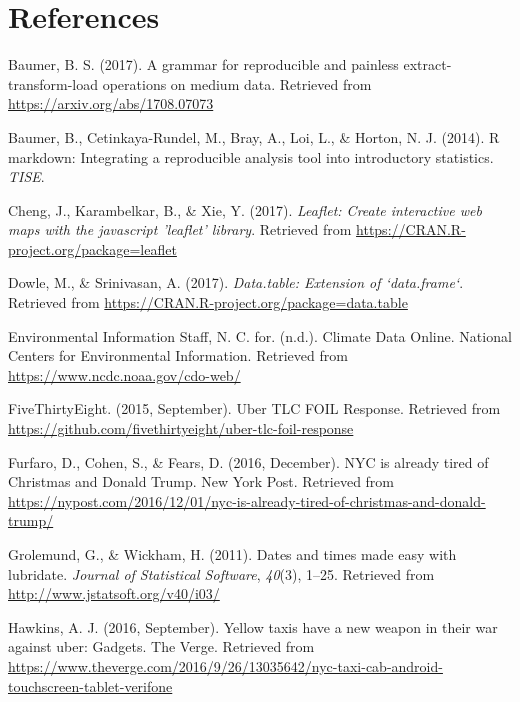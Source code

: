 \documentclass[12pt,twoside]{reedthesis}
\theoremstyle{definition}
\theoremstyle{definition}
\theoremstyle{definition}
\theoremstyle{remark}
\begin{document}
\chapter*{References}\label{references}


\noindent

\setlength{\parindent}{-0.20in} \setlength{\leftskip}{0.20in}
\setlength{\parskip}{8pt}

\hypertarget{refs}{}
\hypertarget{ref-pkgetl}{}
Baumer, B. S. (2017). A grammar for reproducible and painless
extract-transform-load operations on medium data. Retrieved from
\url{https://arxiv.org/abs/1708.07073}

\hypertarget{ref-baumer2014}{}
Baumer, B., Cetinkaya-Rundel, M., Bray, A., Loi, L., \& Horton, N. J.
(2014). R markdown: Integrating a reproducible analysis tool into
introductory statistics. \emph{TISE}.

\hypertarget{ref-pkgleaflet}{}
Cheng, J., Karambelkar, B., \& Xie, Y. (2017). \emph{Leaflet: Create
interactive web maps with the javascript 'leaflet' library}. Retrieved
from \url{https://CRAN.R-project.org/package=leaflet}

\hypertarget{ref-pkgdatatable}{}
Dowle, M., \& Srinivasan, A. (2017). \emph{Data.table: Extension of
`data.frame`}. Retrieved from
\url{https://CRAN.R-project.org/package=data.table}

\hypertarget{ref-noaa}{}
Environmental Information Staff, N. C. for. (n.d.). Climate Data Online.
National Centers for Environmental Information. Retrieved from
\url{https://www.ncdc.noaa.gov/cdo-web/}

\hypertarget{ref-uber538}{}
FiveThirtyEight. (2015, September). Uber TLC FOIL Response. Retrieved
from \url{https://github.com/fivethirtyeight/uber-tlc-foil-response}

\hypertarget{ref-furfaro2016}{}
Furfaro, D., Cohen, S., \& Fears, D. (2016, December). NYC is already
tired of Christmas and Donald Trump. New York Post. Retrieved from
\url{https://nypost.com/2016/12/01/nyc-is-already-tired-of-christmas-and-donald-trump/}

\hypertarget{ref-pkglubridate}{}
Grolemund, G., \& Wickham, H. (2011). Dates and times made easy with
lubridate. \emph{Journal of Statistical Software}, \emph{40}(3), 1--25.
Retrieved from \url{http://www.jstatsoft.org/v40/i03/}

\hypertarget{ref-andrew2016}{}
Hawkins, A. J. (2016, September). Yellow taxis have a new weapon in
their war against uber: Gadgets. The Verge. Retrieved from
\url{https://www.theverge.com/2016/9/26/13035642/nyc-taxi-cab-android-touchscreen-tablet-verifone}
\end{document}
